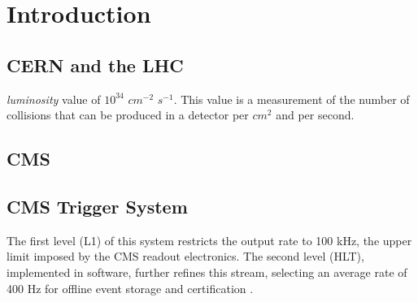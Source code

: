 \chapter{Introduction}








\section{CERN and the LHC}

\textit{luminosity} value of $10^{34}$ $cm^{-2}$ $s^{-1}$. This value is a measurement of the number of collisions that can be produced in a detector per $cm^2$ and per second.

\section{CMS}


\section{CMS Trigger System}

The first level (L1) of this system restricts the output rate to 100 kHz, the upper limit imposed by the CMS readout electronics. The second level (HLT), implemented in software, further refines this stream, selecting an average rate of 400 Hz for offline event storage and certification \cite{Khachatryan_2017}.

